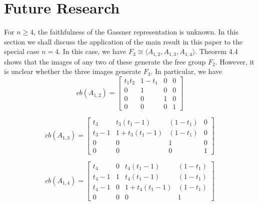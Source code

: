\documentclass[11pt]{article}
\begin{document}
\section{Future Research}
For $n\geq 4$, the faithfulness of the Gassner representation is unknown. In this section we shall discuss the application of the main result in this paper to the special case $n=4$. In this case, we have 
$F_3\cong \langle A_{1,2},A_{1,3},A_{1,4}\rangle$. Theorem 4.4 shows that the images of any two of these generate the free group $F_2$. However, it is unclear whether the three images generate $F_3$. In particular, we have
\pagebreak
	$$cb(A_{1,2})=
	\begin{bmatrix}
	t_1t_2 & 1-t_1 & 0 & 0 \\
	0 & 1 & 0 & 0\\
	0 & 0 & 1 & 0\\
	0 & 0 & 0 & 1
	\end{bmatrix}$$
	
	$$cb(A_{1,3})=
	\begin{bmatrix}
	t_3 & t_3(t_1-1) & (1-t_1) & 0 \\
	t_3-1 & 1+t_3(t_1-1) & (1-t_1) & 0\\
	0 & 0 & 1 & 0\\
	0 & 0 & 0 & 1
	\end{bmatrix}$$

	$$cb(A_{1,4})=
	\begin{bmatrix}
	t_4 & 0 & t_4(t_1-1) & (1-t_1) \\
	t_4-1 & 1 & t_4(t_1-1) & (1-t_1)\\
	t_4-1 & 0 & 1+t_4(t_1-1) & (1-t_1)\\
	0 & 0 & 0 & 1
	\end{bmatrix}$$ 
	
\end{document}
